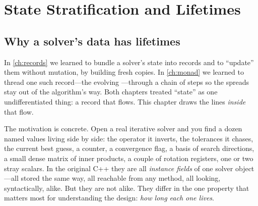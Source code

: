 \chapter{State Stratification and Lifetimes}
\label{ch:strata}


\section{Why a solver's data has lifetimes}

In \cref{ch:records} we learned to bundle a solver's state into records and to
``update'' them without mutation, by building fresh copies. In \cref{ch:monad}
we learned to thread one such record---the evolving ---through a
chain of steps so the spreads stay out of the algorithm's way. Both chapters
treated ``state'' as one undifferentiated thing: a record that flows. This
chapter draws the lines \emph{inside} that flow.

The motivation is concrete. Open a real iterative solver and you find a dozen
named values living side by side: the operator it inverts, the tolerances it
chases, the current best guess, a counter, a convergence flag, a basis of search
directions, a small dense matrix of inner products, a couple of rotation
registers, one or two stray scalars. In the original C++ they are all
\emph{instance fields} of one solver object---all stored the same way, all
reachable from any method, all looking, syntactically, alike. But they are not
alike. They differ in the one property that matters most for understanding the
design: \emph{how long each one lives}.

